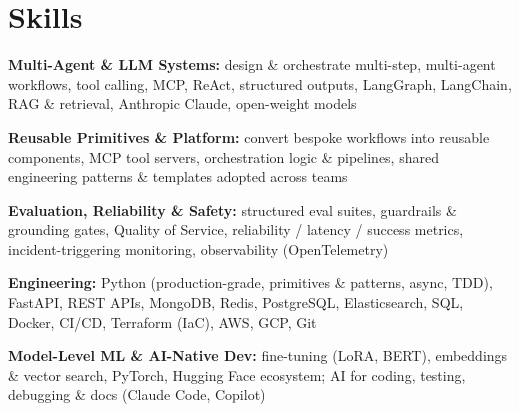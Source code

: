 \documentclass[10pt,a4paper]{article}
\begin{document}
\section{Skills}
\begin{tight}
  \item[\textcolor{accent}{\small$\bullet$}] \textbf{Multi-Agent \& LLM Systems:} design \& orchestrate multi-step, multi-agent workflows, tool calling, MCP, ReAct, structured outputs, LangGraph, LangChain, RAG \& retrieval, Anthropic Claude, open-weight models
  \item[\textcolor{accent}{\small$\bullet$}] \textbf{Reusable Primitives \& Platform:} convert bespoke workflows into reusable components, MCP tool servers, orchestration logic \& pipelines, shared engineering patterns \& templates adopted across teams
  \item[\textcolor{accent}{\small$\bullet$}] \textbf{Evaluation, Reliability \& Safety:} structured eval suites, guardrails \& grounding gates, Quality of Service, reliability / latency / success metrics, incident-triggering monitoring, observability (OpenTelemetry)
  \item[\textcolor{accent}{\small$\bullet$}] \textbf{Engineering:} Python (production-grade, primitives \& patterns, async, TDD), FastAPI, REST APIs, MongoDB, Redis, PostgreSQL, Elasticsearch, SQL, Docker, CI/CD, Terraform (IaC), AWS, GCP, Git
  \item[\textcolor{accent}{\small$\bullet$}] \textbf{Model-Level ML \& AI-Native Dev:} fine-tuning (LoRA, BERT), embeddings \& vector search, PyTorch, Hugging Face ecosystem; AI for coding, testing, debugging \& docs (Claude Code, Copilot)
\end{tight}

\end{document}
